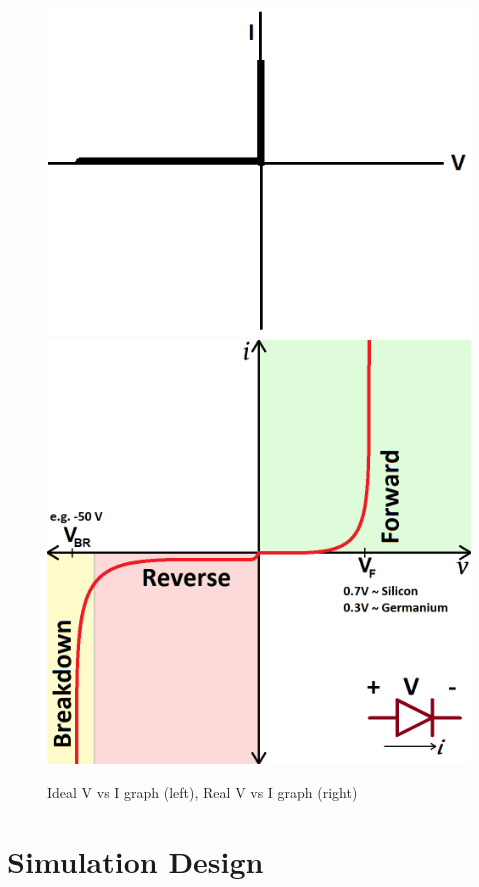\documentclass[a4paper]{article}
\begin{document}
\begin{figure}[H]
\centering
\includegraphics[scale=0.6]{08.png}\includegraphics[scale=0.23]{06.png}
\caption{\label{fig} Ideal V vs I graph (left), Real V vs I graph (right)}
\end{figure}


\section{Simulation Design}
\end{document}
